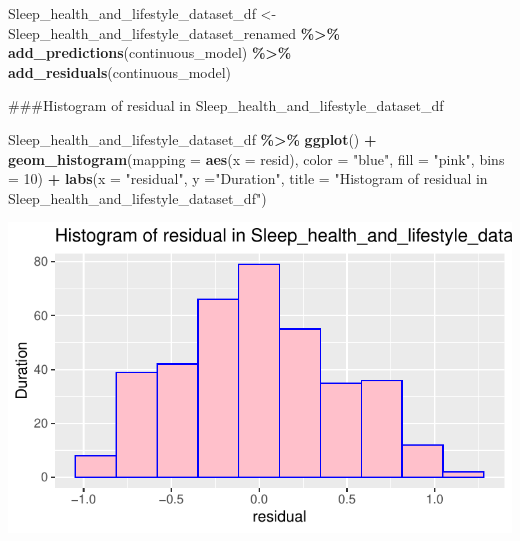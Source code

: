 \documentclass[
  11pt,
]{article}
\newenvironment{Shaded}{\begin{snugshade}}{\end{snugshade}}
\newcommand{\AttributeTok}[1]{\textcolor[rgb]{0.13,0.29,0.53}{#1}}
\newcommand{\DecValTok}[1]{\textcolor[rgb]{0.00,0.00,0.81}{#1}}
\newcommand{\FunctionTok}[1]{\textcolor[rgb]{0.13,0.29,0.53}{\textbf{#1}}}
\newcommand{\NormalTok}[1]{#1}
\newcommand{\OtherTok}[1]{\textcolor[rgb]{0.56,0.35,0.01}{#1}}
\newcommand{\SpecialCharTok}[1]{\textcolor[rgb]{0.81,0.36,0.00}{\textbf{#1}}}
\newcommand{\StringTok}[1]{\textcolor[rgb]{0.31,0.60,0.02}{#1}}
\begin{document}
\begin{Shaded}
\end{Shaded}

\begin{Shaded}
\begin{Highlighting}[]
\NormalTok{Sleep\_health\_and\_lifestyle\_dataset\_df }\OtherTok{\textless{}{-}}\NormalTok{ Sleep\_health\_and\_lifestyle\_dataset\_renamed }\SpecialCharTok{\%\textgreater{}\%}
  \FunctionTok{add\_predictions}\NormalTok{(continuous\_model) }\SpecialCharTok{\%\textgreater{}\%}
  \FunctionTok{add\_residuals}\NormalTok{(continuous\_model)}
\end{Highlighting}
\end{Shaded}

\#\#\#Histogram of residual in
Sleep\_health\_and\_lifestyle\_dataset\_df

\begin{Shaded}
\begin{Highlighting}[]
\NormalTok{Sleep\_health\_and\_lifestyle\_dataset\_df }\SpecialCharTok{\%\textgreater{}\%}
  \FunctionTok{ggplot}\NormalTok{() }\SpecialCharTok{+}
  \FunctionTok{geom\_histogram}\NormalTok{(}\AttributeTok{mapping =} \FunctionTok{aes}\NormalTok{(}\AttributeTok{x =}\NormalTok{ resid), }\AttributeTok{color =} \StringTok{"blue"}\NormalTok{, }\AttributeTok{fill =} \StringTok{"pink"}\NormalTok{, }\AttributeTok{bins =} \DecValTok{10}\NormalTok{) }\SpecialCharTok{+}
  \FunctionTok{labs}\NormalTok{(}\AttributeTok{x =} \StringTok{"residual"}\NormalTok{, }\AttributeTok{y =}\StringTok{"Duration"}\NormalTok{,}
\AttributeTok{title =} \StringTok{"Histogram of residual in Sleep\_health\_and\_lifestyle\_dataset\_df"}\NormalTok{)}
\end{Highlighting}
\end{Shaded}

\begin{center}\includegraphics[width=0.7\linewidth]{SleepHelath_files/figure-latex/unnamed-chunk-57-1} \end{center}
\end{document}
